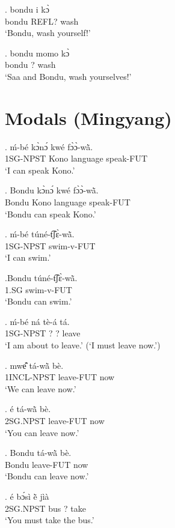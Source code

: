 \documentclass{assets/fieldnotes}
\begin{document}
{\exg. bondu i kɔ̀ \\
bondu REFL? wash \\
`Bondu, wash yourself!' 

\exg. bondu momo kɔ̀ \\
bondu ? wash \\
`Saa and Bondu, wash yourselves!'

\section{Modals (Mingyang)} 


\par
{}
\exg. ḿ-bé kɔ̀nɔ́ kwé fɔ̀ɔ̀-wã̀.\\
    1SG-NPST Kono language speak-FUT\\
    `I can speak Kono.'

\exg. Bondu kɔ̀nɔ́ kwé fɔ̀ɔ̀-wã̀.\\
    Bondu Kono language speak-FUT\\
    `Bondu can speak Kono.'

\exg. ḿ-bé túné-t͡ʃɛ̀-wã̀.\\
    1SG-NPST swim-v-FUT\\
    `I can swim.'

\exg.Bondu túné-t͡ʃɛ̀-wã̀.\\
    1.SG swim-v-FUT\\
    `Bondu can swim.'

\par
{}
\exg. ḿ-bé ná tè-á tá.\\
    1SG-NPST ? ? leave\\
    `I am about to leave.' (`I must leave now.')

\exg. mwe᷈̂ tá-wã̀ bè.\\
    1INCL-NPST leave-FUT now\\
    `We can leave now.'

\exg. é tá-wã̀ bè.\\
    2SG.NPST leave-FUT now\\
    `You can leave now.'

\exg. Bondu tá-wã̀ bè.\\
    Bondu leave-FUT now\\
    `Bondu can leave now.'

\par
{}
\exg. é bɔ́sì ẽ̀ jìà\\
    2SG.NPST bus ? take\\
    `You must take the bus.'

}
\end{document}
